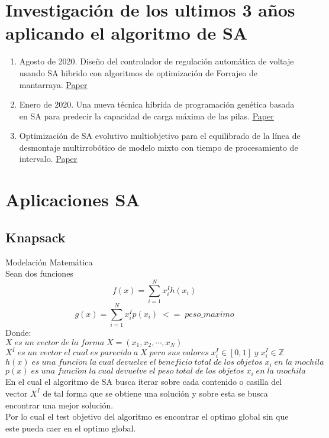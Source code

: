 \documentclass[10pt]{article}
\begin{document}
\section{Investigación de los ultimos 3 años aplicando el algoritmo de SA}
\begin{enumerate}
  \item Agosto de 2020. Diseño del controlador de regulación automática de voltaje usando SA hibrido con algoritmos de optimización de Forrajeo de mantarraya. \underline{\href{https://www.sciencedirect.com/science/article/pii/S2090447920301416}{Paper}}
  \item Enero de 2020. Una nueva técnica híbrida de programación genética basada en SA para predecir la capacidad de carga máxima de las pilas. \underline{\href{https://link.springer.com/article/10.1007/s00366-019-00932-9}{Paper}}
  \item Optimización de SA evolutivo multiobjetivo para el equilibrado de la línea de desmontaje multirrobótico de modelo mixto con tiempo de procesamiento de intervalo. \underline{\href{https://www.tandfonline.com/doi/abs/10.1080/00207543.2019.1602290}{Paper}}
\end{enumerate}
\section{Aplicaciones SA}
\subsection{Knapsack}
Modelación Matemática\\
Sean dos funciones
\[f(x)=\sum_{i=1}^{N}x^{I}_{i}h(x_{i})\]
\[g(x)=\sum_{i=1}^{N}x^{I}_{i}p(x_{i})\;<=\;peso\_maximo\]
Donde:\\
\(\displaystyle X\;es\;un\;vector\;de\;la\;forma\;X=(x_{1},x_{2},\cdots,x_{N})\)\\\vspace{0.25cm}
\(\displaystyle X^{I}\;es\;un\;vector\;el\;cual\;es\;parecido\;a\;X\;pero\;sus\;valores\;x_{i}^{I}\in[0,1]\;y\;x_{i}^{I}\in\mathbb{Z}\)\\\vspace{0.25cm}
\(\displaystyle h(x)\;es\;una\;funci\acute{o}n\;la\;cual\;devuelve\;el\;beneficio\;total\;de\;los\;objetos\;x_{i}\;en\;la\;mochila\)\\\vspace{0.25cm}
\(\displaystyle p(x)\;es\;una\;funci\acute{o}n\;la\;cual\;devuelve\;el\;peso\;total\;de\;los\;objetos\;x_{i}\;en\;la\;mochila\)\\\vspace{0.25cm}
En el cual el algoritmo de SA busca iterar sobre cada contenido o casilla del vector $X^{I}$ de tal forma que se obtiene una solución y sobre esta se busca encontrar una mejor solución.\\
Por lo cual el test objetivo del algoritmo es encontrar el optimo global sin que este pueda caer en el optimo global.
\end{document}
